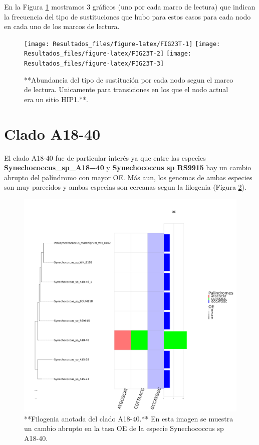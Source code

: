 \documentclass[
]{book}
\begin{document}
En la Figura \ref{fig:FIG23T} mostramos 3 gráficos (uno por cada marco de lectura) que indican la frecuencia del tipo de sustituciones que hubo para estos casos para cada nodo en cada uno de los marcos de lectura.

\begin{figure}

{\centering \texttt{[image: Resultados\_files/figure-latex/FIG23T-1]} \texttt{[image: Resultados\_files/figure-latex/FIG23T-2]} \texttt{[image: Resultados\_files/figure-latex/FIG23T-3]} 

}

\caption{**Abundancia del tipo de sustitución por cada nodo segun el marco de lectura. Unicamente para transiciones en los que el nodo actual era un sitio HIP1.**.}\label{fig:FIG23T}
\end{figure}

\hypertarget{clado-a18-40}{%
\section{Clado A18-40}\label{clado-a18-40}}

El clado A18-40 fue de particular interés ya que entre las especies \textbf{Synechococcus\_sp\_A18−40} y \textbf{Synechococcus sp RS9915} hay un cambio abrupto del palíndromo con mayor OE. Más aun, los genomas de ambas especies son muy parecidos y ambas especias son cercanas segun la filogenia (Figura \ref{fig:FIG7}).

\begin{figure}

{\centering \includegraphics[width=1\linewidth]{figures/A18-40_Octanuc_OE_sel32_filogenia_HIG} 

}

\caption{**Filogenia anotada del clado A18-40.** En esta imagen se muestra un cambio abrupto en la tasa OE de la especie Synechococcus sp A18-40.}\label{fig:FIG7}
\end{figure}
\end{document}
